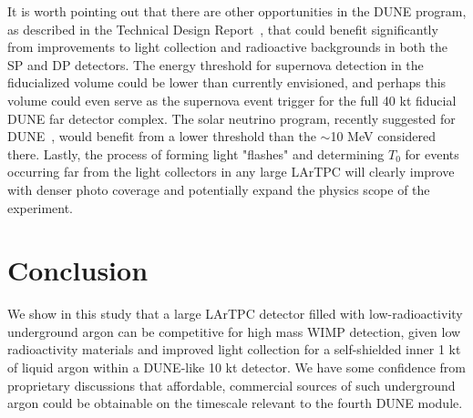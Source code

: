 \documentclass[a4paper,11pt]{article}
\newcommand{\todo}[1]{{\tt \color{red}#1}}
\begin{document}

It is worth pointing out that there are other opportunities in the DUNE program, as described in the Technical Design Report~\cite{TDR}, that could benefit significantly from improvements to light collection and radioactive backgrounds in both the SP and DP detectors. The energy threshold for supernova detection in the fiducialized volume could be lower than currently envisioned, and perhaps this volume could even serve as the supernova event trigger for the full 40 kt fiducial DUNE far detector complex. The solar neutrino program, recently suggested for DUNE~\cite{beacom_snu}, would benefit from a lower threshold than the $\sim$10 MeV considered there. Lastly, the process of forming light "flashes" and determining $T_0$ for events occurring far from the light collectors in any large LArTPC will clearly improve with denser photo coverage and potentially expand the physics scope of the experiment.

\section{Conclusion}
We show in this study that a large LArTPC detector filled with low-radioactivity underground argon can be competitive for high mass WIMP detection, given low radioactivity materials and improved light collection for a self-shielded inner 1 kt of liquid argon within a DUNE-like 10 kt detector. We have some confidence from proprietary discussions that affordable, commercial sources of such underground argon could be obtainable on the timescale relevant to the fourth DUNE module.
\end{document}
